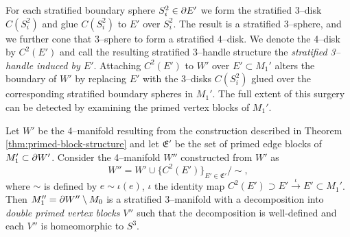 For each stratified boundary sphere $S_i^2\in\partial E'$ we form the stratified 3--disk $C(S_i^2)$ and glue $C(S_i^2)$ to $E'$ over $S_i^2$.
The result is a stratified 3--sphere, and we further cone that 3--sphere to form a stratified 4--disk.
We denote the 4--disk by $C^2(E')$ and call the resulting stratified 3--handle structure the \emph{stratified 3--handle induced by $E'$}.
Attaching $C^2(E')$ to $W'$ over $E'\subset M_1'$ alters the boundary of $W'$ by replacing $E'$ with the 3--disks $C(S_i^2)$ glued over the corresponding stratified boundary spheres in $M_1'$.
The full extent of this surgery can be detected by examining the primed vertex blocks of $M_1'$.

\begin{cor}
	\label{thm:primed-primed-block-structure}
	Let $W'$ be the 4--manifold resulting from the construction described in Theorem \ref{thm:primed-block-structure} and let $\mathfrak{E}'$ be the set of primed edge blocks of $M_1'\subset\partial W'$.
	Consider the 4--manifold $W''$ constructed from $W'$ as
	\[
	W'' = W'\cup\{C^2(E')\}_{E'\in \mathfrak{E}'} / \sim,
	\]
	where $\sim$ is defined by $e\sim \iota(e)$, $\iota$ the identity map $C^2(E')\supset E'\overset{\iota}{\to} E'\subset M_1'$.
	Then $M_1''=\partial W''\setminus M_0$ is a stratified 3--manifold with a decomposition into \emph{double primed vertex blocks} $V''$ such that the decomposition is well-defined and each $V''$ is homeomorphic to $S^3$.
\end{cor}


